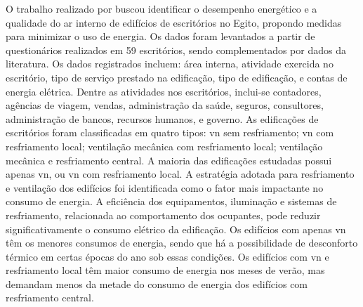 \documentclass[brazil,hardcopy,openany]{ufscthesis} %
\begin{document}
O trabalho realizado por  buscou identificar o desempenho energético e a qualidade do ar interno de edifícios de escritórios no Egito, propondo medidas para minimizar o uso de energia. Os dados foram levantados a partir de questionários realizados em 59 escritórios, sendo complementados por dados da literatura. Os dados registrados incluem: área interna, atividade exercida no escritório, tipo de serviço prestado na edificação, tipo de edificação, e contas de energia elétrica. Dentre as atividades nos escritórios, inclui-se contadores, agências de viagem, vendas, administração da saúde, seguros, consultores, administração de bancos, recursos humanos, e governo. As edificações de escritórios foram classificadas em quatro tipos: \acrshort{vn} sem resfriamento; \acrshort{vn} com resfriamento local; ventilação mecânica com resfriamento local; ventilação mecânica e resfriamento central. A maioria das edificações estudadas possui apenas \acrlong{vn}, ou \acrshort{vn} com resfriamento local. A estratégia adotada para resfriamento e ventilação dos edifícios foi identificada como o fator mais impactante no consumo de energia. A eficiência dos equipamentos, iluminação e sistemas de resfriamento, relacionada ao comportamento dos ocupantes, pode reduzir significativamente o consumo elétrico da edificação. 
Os edifícios com apenas \acrshort{vn} têm os menores consumos de energia, sendo que há a possibilidade de desconforto térmico em certas épocas do ano sob essas condições. Os edifícios com \acrshort{vn} e resfriamento local têm maior consumo de energia nos meses de verão, mas demandam menos da metade do consumo de energia dos edifícios com resfriamento central.
\end{document}

